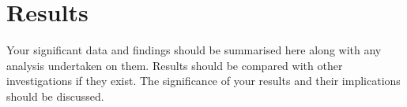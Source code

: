 \chapter{Results} \label{chapter:Results}
Your significant data and findings should be summarised here along with any analysis undertaken on them. Results should be compared with other investigations if they exist. The significance of your results and their implications should be discussed.
